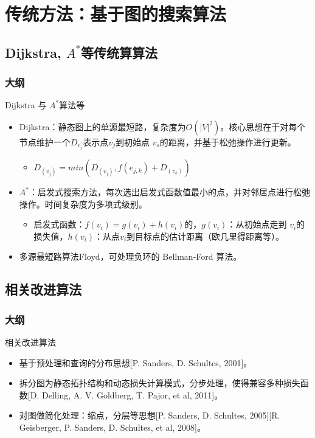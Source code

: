 \documentclass{beamer}
\begin{document}
\section{传统方法：基于图的搜索算法}

\subsection{Dijkstra, $A^*$等传统算算法}
\begin{frame}
\frametitle{大纲} %
\tableofcontents
    [
        currentsection,
        currentsubsection,
        subsectionstyle=show/shaded/hide
    ]
\end{frame}

\begin{frame}{Dijkstra 与 $A^*$算法等}
\begin{itemize}
    \item Dijkstra：静态图上的单源最短路，复杂度为$O(|V|^2)$。核心思想在于对每个节点维护一个$D_{v_j}$表示点$v_j$到初始点 $v_s$的距离，并基于松弛操作进行更新。
    \begin{itemize}
        \item $D_{(v_j)} = min(D_{(v_j)}, f(e_{j,k})+ D_{(v_k)})$
    \end{itemize}
    \item $A^*$：启发式搜索方法，每次选出启发式函数值最小的点，并对邻居点进行松弛操作。时间复杂度为多项式级别。
        \begin{itemize}
        \item 启发式函数：$f(v_i) = g(v_i) + h(v_i)$的，$g(v_i)$：从初始点走到 $v_i$的损失值，$h(v_i)$：从点$v_i$到目标点的估计距离（欧几里得距离等）。
        \end{itemize}
    \item 多源最短路算法Floyd，可处理负环的 Bellman-Ford 算法。
\end{itemize}
\end{frame}

\subsection{相关改进算法}
\begin{frame}
\frametitle{大纲} %
\tableofcontents
    [
        currentsection,
        currentsubsection,
        subsectionstyle=show/shaded/hide
    ]
\end{frame}
\begin{frame}{相关改进算法}
\begin{itemize}
    \item 基于预处理和查询的分布思想[P. Sanders, D. Schultes, 2001]。
    \item 拆分图为静态拓扑结构和动态损失计算模式，分步处理，使得兼容多种损失函数[D. Delling, A. V. Goldberg, T. Pajor, et al, 2011]。
    \item 对图做简化处理：缩点，分层等思想[P. Sanders, D. Schultes, 2005][R. Geisberger, P. Sanders, D. Schultes, et al, 2008]。
\end{itemize}
\end{frame}
\end{document}
